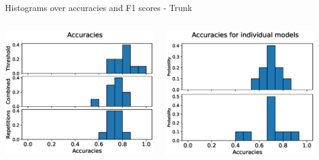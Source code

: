 \begin{frame}[fragile]{Histograms over accuracies and F1 scores - Trunk}
  \vspace{0.2cm}
  \begin{columns}
  \includegraphics[width=\textwidth]{files/figs/res/trunk/acc.eps}

  \includegraphics[width=\textwidth]{files/figs/res/trunk/acc-ind.eps}


\end{columns}
\end{frame}
